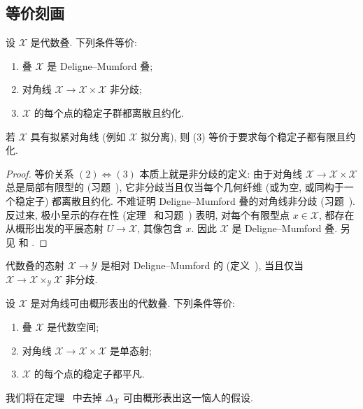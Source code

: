 \subsection{等价刻画}\label{src:4.6.2-subsection}
\begin{theorem}\label{src:4.6.4}
设 $\mathcal X$ 是代数叠. 下列条件等价:
\begin{enumerate}[(1)]
\item 叠 $\mathcal X$ 是 Deligne--Mumford 叠;
\item 对角线 $\mathcal X\to\mathcal X\times\mathcal X$ 非分歧;
\item $\mathcal X$ 的每个点的稳定子群都离散且约化.
\end{enumerate}
若 $\mathcal X$ 具有拟紧对角线 (例如 $\mathcal X$ 拟分离), 则 (3) 等价于要求每个稳定子都有限且约化.
\end{theorem}
\begin{proof}
等价关系 $(2)\Leftrightarrow(3)$ 本质上就是非分歧的定义: 由于对角线 $\mathcal X\to\mathcal X\times\mathcal X$ 总是局部有限型的 (习题~), 它非分歧当且仅当每个几何纤维 (或为空, 或同构于一个稳定子) 都离散且约化. 不难证明 Deligne--Mumford 叠的对角线非分歧 (习题~). 反过来, 极小呈示的存在性 (定理~ 和习题~) 表明, 对每个有限型点 $x\in\mathcal X$, 都存在从概形出发的平展态射 $U\to\mathcal X$, 其像包含 $x$. 因此 $\mathcal X$ 是 Deligne--Mumford 叠. 另见 \cite[定理 $8.1$]{LMB00} 和 \cite[Tag 06N3]{SP}.
\end{proof}
\begin{corollary}\label{src:4.6.5}
代数叠的态射 $\mathcal X\to\mathcal Y$ 是相对 Deligne--Mumford 的 (定义~), 当且仅当 $\mathcal X\to\mathcal X\times_{\mathcal Y}\mathcal X$ 非分歧.
\end{corollary}
\begin{theorem}[代数空间的刻画]\label{src:4.6.6}
设 $\mathcal X$ 是对角线可由概形表出的代数叠. 下列条件等价:
\begin{enumerate}[(1)]
\item 叠 $\mathcal X$ 是代数空间;
\item 对角线 $\mathcal X\to\mathcal X\times\mathcal X$ 是单态射;
\item $\mathcal X$ 的每个点的稳定子都平凡.
\end{enumerate}
\end{theorem}
\begin{remark}\label{src:4.6.7}
我们将在定理~ 中去掉 $\Delta_{\mathcal X}$ 可由概形表出这一恼人的假设.
\end{remark}
